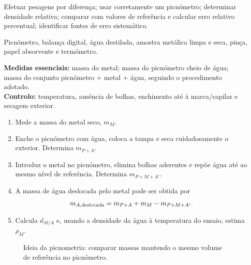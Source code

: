 \documentclass[11pt,a4paper,openany]{book}
\begin{document}
\begin{objetivos}
Efetuar pesagens por diferença; usar corretamente um picnómetro; determinar densidade relativa; comparar com valores de referência e calcular erro relativo percentual; identificar fontes de erro sistemático.
\end{objetivos}

\begin{material}
Picnómetro, balança digital, água destilada, amostra metálica limpa e seca, pinça, papel absorvente e termómetro.
\end{material}

\begin{variaveis}
\textbf{Medidas essenciais:} massa do metal; massa do picnómetro cheio de água; massa do conjunto picnómetro + metal + água, seguindo o procedimento adotado.\\
\textbf{Controlo:} temperatura, ausência de bolhas, enchimento até à marca/capilar e secagem exterior.
\end{variaveis}

\begin{metodo}
\begin{enumerate}
\item Mede a massa do metal seco, $m_M$.
\item Enche o picnómetro com água, coloca a tampa e seca cuidadosamente o exterior. Determina $m_{P+A}$.
\item Introduz o metal no picnómetro, elimina bolhas aderentes e repõe água até ao mesmo nível de referência. Determina $m_{P+M+A'}$.
\item A massa de água deslocada pelo metal pode ser obtida por
\[
 m_{A,\rm deslocada}=m_{P+A}+m_M-m_{P+M+A'}.
\]
\item Calcula $d_{M/A}$ e, usando a densidade da água à temperatura do ensaio, estima $\rho_M$.
\end{enumerate}
\end{metodo}

\begin{figure}[H]
\centering
{}
\caption{Ideia da picnometria: comparar massas mantendo o mesmo volume de referência no picnómetro.}
\end{figure}
\end{document}
